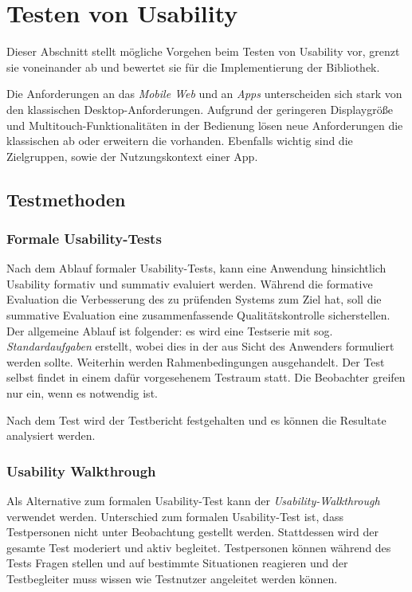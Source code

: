 \section{Testen von Usability}
\label{usability_testing}

Dieser Abschnitt stellt mögliche Vorgehen beim Testen von Usability vor, grenzt sie voneinander ab und bewertet sie für die Implementierung der Bibliothek. 

Die Anforderungen an das \textit{Mobile Web} und an \textit{Apps} unterscheiden sich stark von den klassischen Desktop-Anforderungen. 
Aufgrund der geringeren Displaygröße und Multitouch-Funktionalitäten in der Bedienung lösen neue Anforderungen die klassischen ab oder erweitern die vorhanden. 
Ebenfalls wichtig sind die Zielgruppen, sowie der Nutzungskontext einer App. \cite[vgl.]{usabilityblog_wasBeachten}

\subsection{Testmethoden \label{sec:testmethoden}}

\subsubsection{Formale Usability-Tests \label{sec:formal-usability-test}}

Nach dem Ablauf formaler Usability-Tests, kann eine Anwendung hinsichtlich Usability formativ und summativ evaluiert werden. 
Während die formative Evaluation die Verbesserung des zu prüfenden Systems zum Ziel hat, soll die summative Evaluation eine zusammenfassende Qualitätskontrolle sicherstellen. Der allgemeine Ablauf ist folgender: es wird eine Testserie mit sog. \textit{Standardaufgaben} erstellt, wobei dies in der aus Sicht des Anwenders formuliert werden sollte.
Weiterhin werden Rahmenbedingungen ausgehandelt. 
Der Test selbst findet in einem dafür vorgesehenem Testraum statt. 
Die Beobachter greifen nur ein, wenn es notwendig ist. \cite[vgl.][86\psq]{usabilityEngineeringKompakt} 

Nach dem Test wird der Testbericht festgehalten und es können die Resultate analysiert werden. 

\subsubsection{Usability Walkthrough}

Als Alternative zum formalen Usability-Test kann der \textit{Usability-Walkthrough} verwendet werden. 
Unterschied zum formalen Usability-Test ist, dass Testpersonen nicht unter Beobachtung gestellt werden. 
Stattdessen wird der gesamte Test moderiert und aktiv begleitet. 
Testpersonen können während des Tests Fragen stellen und auf bestimmte Situationen reagieren und der Testbegleiter muss wissen wie Testnutzer angeleitet werden können. \cite[vgl.][93]{usabilityEngineeringKompakt}

